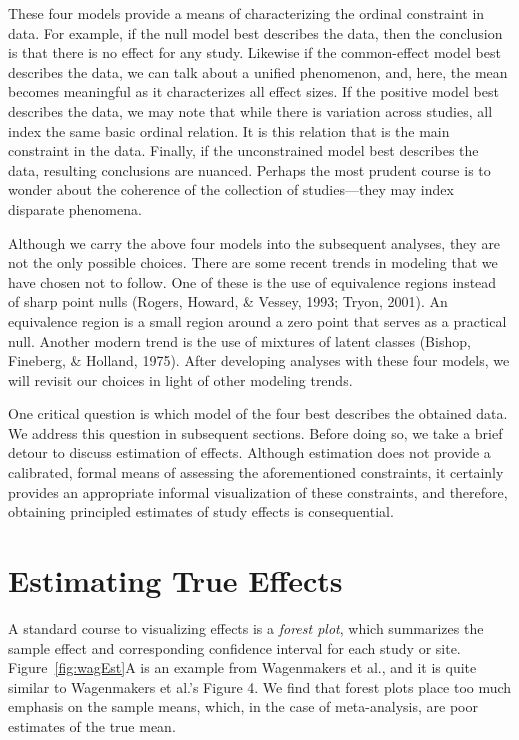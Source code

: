\documentclass[english,man]{apa6}
\theoremstyle{definition}
\theoremstyle{definition}
\theoremstyle{remark}
\begin{document}
These four models provide a means of characterizing the ordinal
constraint in data. For example, if the null model best describes the
data, then the conclusion is that there is no effect for any study.
Likewise if the common-effect model best describes the data, we can talk
about a unified phenomenon, and, here, the mean becomes meaningful as it
characterizes all effect sizes. If the positive model best describes the
data, we may note that while there is variation across studies, all
index the same basic ordinal relation. It is this relation that is the
main constraint in the data. Finally, if the unconstrained model best
describes the data, resulting conclusions are nuanced. Perhaps the most
prudent course is to wonder about the coherence of the collection of
studies---they may index disparate phenomena.

Although we carry the above four models into the subsequent analyses,
they are not the only possible choices. There are some recent trends in
modeling that we have chosen not to follow. One of these is the use of
equivalence regions instead of sharp point nulls (Rogers, Howard, \&
Vessey, 1993; Tryon, 2001). An equivalence region is a small region
around a zero point that serves as a practical null. Another modern
trend is the use of mixtures of latent classes (Bishop, Fineberg, \&
Holland, 1975). After developing analyses with these four models, we
will revisit our choices in light of other modeling trends.

One critical question is which model of the four best describes the
obtained data. We address this question in subsequent sections. Before
doing so, we take a brief detour to discuss estimation of effects.
Although estimation does not provide a calibrated, formal means of
assessing the aforementioned constraints, it certainly provides an
appropriate informal visualization of these constraints, and therefore,
obtaining principled estimates of study effects is consequential.

\section{Estimating True Effects}\label{estimating-true-effects}

A standard course to visualizing effects is a \emph{forest plot}, which
summarizes the sample effect and corresponding confidence interval for
each study or site. Figure~\ref{fig:wagEst}A is an example from
Wagenmakers et al., and it is quite similar to Wagenmakers et al.'s
Figure 4. We find that forest plots place too much emphasis on the
sample means, which, in the case of meta-analysis, are poor estimates of
the true mean.
\end{document}
